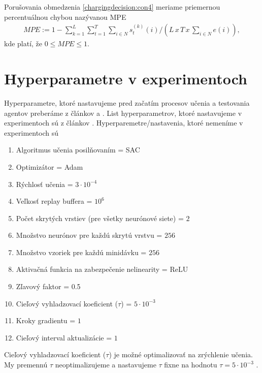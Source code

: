 \noindent
Porušovania obmedzenia \eqref{chargingdecision:con4} meriame priemernou percentuálnou chybou nazývanou MPE 
\begin{gather*}
    MPE := 1 - \sum_{k=1}^{L} \sum_{t=1}^{T}\sum_{i \in N} s_{t}^{(k)}(i) / (L \, x \, T \, x \, \sum_{i \in N}e(i)),
\end{gather*}
kde platí, že $ 0 \leq MPE \leq 1$.

\section{Hyperparametre v experimentoch}
Hyperparametre, ktoré nastavujeme pred začatím procesov učenia a testovania agentov preberáme z článkov \cite{Li_2021} a \cite{haarnoja2018softactorcriticoffpolicymaximum}.
List hyperparametrov, ktoré nastavujeme v experimentoch sú z článkov \cite{Li_2021,haarnoja2018softactorcriticoffpolicymaximum}. Hyperparemetre/nastavenia, ktoré nemeníme v experimentoch sú
\begin{enumerate}
    \item Algoritmus učenia posilňovaním = SAC
    \item Optimizátor = Adam
    \item Rýchlosť učenia = $3 \cdot 10^{-4}$ 
    \item Veľkosť replay buffera = $10^{6}$  
    \item Počet skrytých vrstiev (pre všetky neurónové siete) = $2$
    \item Množstvo neurónov pre každú skrytú vrstvu = $256$
    \item Množstvo vzoriek pre každú  minidávku = $256$
    \item Aktivačná funkcia na zabezpečenie nelinearity = ReLU
    \item Zľavový faktor = 0.5
    \item Cieľový vyhladzovací koeficient ($\tau$) =   $5\cdot 10^{-3}$
    \item Kroky gradientu = $1$
    \item Cieľový interval aktualizácie = $1$ 
\end{enumerate}
Cieľový vyhladzovací koeficient ($\tau$) je možné optimalizovať na zrýchlenie učenia. My premennú $\tau$ neoptimalizujeme a nastavujeme $\tau$ fixne na hodnotu $\tau = 5\cdot 10^{-3}$ \cite{haarnoja2018softactorcriticoffpolicymaximum}.

